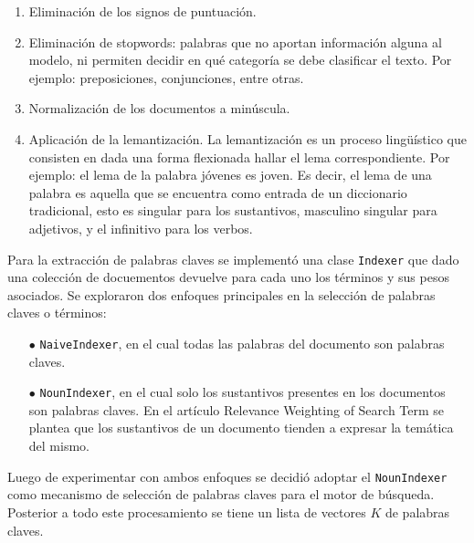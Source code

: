 \begin{enumerate}
    \item Eliminación de los signos de puntuación.
    \item Eliminación de stopwords: palabras que no aportan información alguna al modelo, ni permiten decidir en qué categoría se debe clasificar el texto. Por ejemplo: preposiciones, conjunciones, entre otras.
    \item Normalización de los documentos a minúscula. 
    \item Aplicación de la lemantización.  La lemantización es un proceso lingüístico que consisten en dada una forma flexionada hallar el lema correspondiente. Por ejemplo: el lema de la palabra jóvenes es joven. Es decir, el lema de una palabra es aquella que se encuentra como entrada de un diccionario tradicional, esto es singular para los sustantivos, masculino singular para adjetivos, y el infinitivo para los verbos.
\end{enumerate}

Para la extracción de palabras claves se implementó una clase \verb|Indexer| que dado una colección de docuementos devuelve para cada uno los términos y sus pesos asociados. Se exploraron dos enfoques principales en la selección de palabras claves o términos:

\begin{enumerate}
    \item[$\bullet$] \verb|NaiveIndexer|, en el cual todas las palabras del documento son palabras claves.
    \item[$\bullet$] \verb|NounIndexer|, en el cual solo los sustantivos presentes en los documentos son palabras claves. En el artículo Relevance Weighting of Search Term \cite{re} se plantea que los sustantivos de un documento tienden a expresar la temática del mismo. 
\end{enumerate}

Luego de experimentar con ambos enfoques se decidió adoptar el \verb|NounIndexer| como mecanismo de selección de palabras claves para el motor de búsqueda. Posterior a todo este procesamiento se tiene un lista de vectores $K$ de palabras claves.

